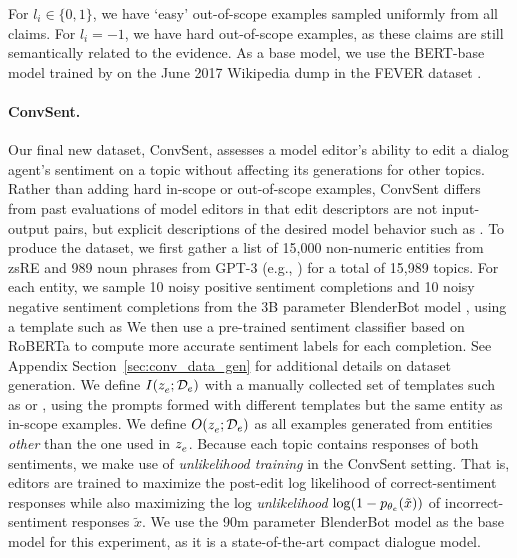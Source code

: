 \documentclass{article}
\begin{document}
For $l_i \in \{0,1\}$, we have `easy' out-of-scope examples sampled uniformly from all claims. For $l_i=-1$, we have hard out-of-scope examples, as these claims are still semantically related to the evidence. As a base model, we use the BERT-base model trained by \citet{Cao2021EditingFK} on the June 2017 Wikipedia dump in the FEVER dataset \citep{Thorne18Fever}.



\paragraph{ConvSent.} Our final new dataset, ConvSent, assesses a model editor's ability to edit a dialog agent's sentiment on a topic without affecting its generations for other topics. Rather than adding hard in-scope or out-of-scope examples, ConvSent differs from past evaluations of model editors in that edit descriptors are not input-output pairs, but explicit descriptions of the desired model behavior such as . To produce the dataset, we first gather a list of 15,000 non-numeric entities from zsRE \citep{levy2017zero,Cao2021EditingFK} and 989 noun phrases from GPT-3 \citep{brown2020language} (e.g., ) for a total of 15,989 topics. For each entity, we sample 10 noisy positive sentiment completions and 10 noisy negative sentiment completions from the 3B parameter BlenderBot model \citep{roller2021recipes}, using a template such as  We then use a pre-trained sentiment classifier \citep{heitmann2020} based on RoBERTa \citep{liu2019robustly} to compute more accurate sentiment labels for each completion. See Appendix Section~\ref{sec:conv_data_gen} for additional details on dataset generation. We define $I(z_e^{}; \mathcal{D}_{e})$ with a manually collected set of templates such as  or , using the prompts formed with different templates but the same entity as in-scope examples. We define $O(z_e^{}; \mathcal{D}_{e})$ as all examples generated from entities \textit{other} than the one used in $z_e^{}$. Because each topic contains responses of both sentiments, we make use of \textit{unlikelihood training} \citep{li2020dont} in the ConvSent setting. That is, editors are trained to maximize the post-edit log likelihood of correct-sentiment responses while also maximizing the log \textit{unlikelihood} $\log(1 - p_{\theta_e}(\tilde x))$ of incorrect-sentiment responses $\tilde x$. We use the 90m parameter BlenderBot model \citep{roller2021recipes} as the base model for this experiment, as it is a state-of-the-art compact dialogue model.
\end{document}
